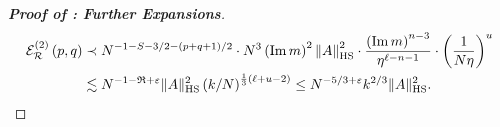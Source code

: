 \documentclass[10pt,reqno]{amsart}
\numberwithin{equation}{section}
\numberwithin{figure}{section}
\theoremstyle{plain} %
\theoremstyle{definition} %
\renewcommand{\txt}[1]{\text{\rm{#1}}}
\newcommand{\cR}{{\mathcal R}}
\newcommand{\cE}{{\mathcal{E}}}
\newcommand{\fR}{\mathfrak R}
\newcommand{\sG}{\mathsf G}
\renewcommand{\leq}{\le}
\newcommand{\p}[1]{({#1})}
\newcommand{\pa}[1]{\left({#1}\right)}
\newcommand{\norm}[1]{\lVert #1 \rVert}
\newcommand{\norma}[1]{\left\lVert #1 \right\rVert}
\DeclareMathOperator{\im}{\mathrm{Im}}
\newcommand{\HS}{\txt{HS}}
\newcommand{\mm}{\ell}
\numberwithin{equation}{section}
\begin{document}
\begin{proof}[\bf Proof of : Further Expansions]
        \begin{equation}\nonumber
            \begin{aligned}
    {\cE_{\cR}^{\pa{2}}\pa{p,q}}&\prec N^{-1-S-3/2-\pa{p+q+1}/2}\cdot N^{3}\pa{\im m}^2\norma{A}_{\HS}^2\cdot \frac{\pa{\im m}^{n-3}}{\eta^{\mm-n-1}}\cdot \pa{\frac{1}{N\eta}}^{u}\\
               & \lesssim N^{-1-\fR+\varepsilon}\norm{A}_{\HS}^2\pa{k/N }^{\frac13\p{\mm+u-2}}\leq N^{-5/3+\varepsilon}k^{2/3}\norm{A}_{\HS}^2.
            \end{aligned}
        \end{equation}


\end{proof}
\end{document}
